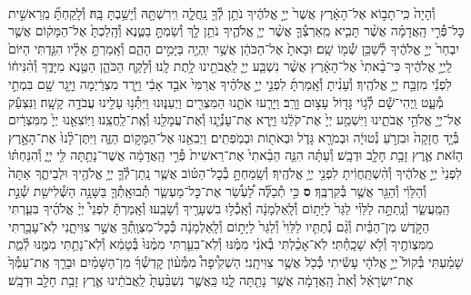 \documentclass[twoside, openany, parskip=half, 11pt]{book}
\begin{document}
\begin{footnotesize}
\begin{multicols}{2}
\\
וְ֯הָיָה֙ כִּֽי־תָב֣וֹא אֶל־הָאָ֔רֶץ אֲשֶׁר֙ יְיָ֣ אֱלֹהֶ֔יךָ נֹתֵ֥ן לְ֯ךָ֖ נַֽחֲלָ֑ה וִֽירִשְׁתָּ֖הּ וְ֯יָשַׁ֥בְתָּ בָּֽהּ׃ וְ֯לָֽקַחְתָּ֞ מֵֽרֵאשִׁ֣ית כׇּל־פְּ֯רִ֣י הָֽאֲדָמָ֗ה אֲשֶׁ֨ר תָּבִ֧יא מֵֽאַרְצְ֯ךָ֛ אֲשֶׁ֨ר יְיָ֧ אֱלֹהֶ֛יךָ נֹתֵ֥ן לָ֖ךְ וְ֯שַׂמְתָּ֣ בַטֶּ֑נֶא וְ֯הָֽלַכְתָּ֙ אֶל־הַמָּק֔וֹם אֲשֶׁ֤ר יִבְחַר֙ יְיָ֣ אֱלֹהֶ֔יךָ לְ֯שַׁכֵּ֥ן שְׁ֯מ֖וֹ שָֽׁם׃ וּבָאתָ֙ אֶל־הַכֹּהֵ֔ן אֲשֶׁ֥ר יִֽהְיֶ֖ה בַּיָּמִ֣ים הָהֵ֑ם וְ֯אָֽמַרְתָּ֣ אֵלָ֗יו הִגַּ֤דְתִּי הַיּוֹם֙ לַֽיְיָ֣ אֱלֹהֶ֔יךָ כִּי־בָ֨אתִי֙ אֶל־הָאָ֔רֶץ אֲשֶׁ֨ר נִשְׁבַּ֧ע יְיָ֛ לַֽאֲבֹתֵ֖ינוּ לָ֥תֶת לָֽנוּ׃
וְ֯לָקַ֧ח הַכֹּהֵ֛ן הַטֶּ֖נֶא מִיָּדֶ֑ךָ וְ֯הִ֨נִּיח֔וֹ לִפְנֵ֕י מִזְבַּ֖ח יְיָ֥ אֱלֹהֶֽיךָ׃ וְ֯עָנִ֨יתָ וְ֯אָֽמַרְתָּ֜ לִפְנֵ֣י יְיָ֣ אֱלֹהֶ֗יךָ אֲרַמִּי֙ אֹבֵ֣ד אָבִ֔י וַיֵּ֣רֶד מִצְרַ֔יְמָה וַיָּ֥גָר שָׁ֖ם בִּמְתֵ֣י מְ֯עָ֑ט וַֽיְהִי־שָׁ֕ם לְ֯ג֥וֹי גָּד֖וֹל עָצ֥וּם וָרָֽב׃ וַיָּרֵ֧עוּ אֹתָ֛נוּ הַמִּצְרִ֖ים וַיְעַנּ֑וּנוּ וַיִּתְּ֯נ֥וּ עָלֵ֖ינוּ עֲבֹדָ֥ה קָשָֽׁה׃ וַנִּצְעַ֕ק אֶל־יְיָ֖ אֱלֹהֵ֣י אֲבֹתֵ֑ינוּ וַיִּשְׁמַ֤ע יְיָ֙ אֶת־קֹלֵ֔נוּ וַיַּ֧רְא אֶת־עָנְ֯יֵ֛נוּ וְ֯אֶת־עֲמָלֵ֖נוּ וְ֯אֶֽת־לַֽחֲצֵֽנוּ׃ וַיּֽוֹצִאֵ֤נוּ יְיָ֙ מִמִּצְרַ֔יִם בְּ֯יָ֤ד חֲזָקָה֙ וּבִזְרֹ֣עַ נְ֯טוּיָ֔ה וּבְמֹרָ֖א גָּדֹ֑ל וּבְאֹת֖וֹת וּבְמֹֽפְתִֽים׃ וַיְבִאֵ֖נוּ אֶל־הַמָּק֣וֹם הַזֶּ֑ה וַיִּתֶּן־לָ֨נוּ֙ אֶת־הָאָ֣רֶץ הַזֹּ֔את אֶ֛רֶץ זָבַ֥ת חָלָ֖ב וּדְבָֽשׁ׃ וְ֯עַתָּ֗ה הִנֵּ֤ה הֵבֵ֨אתִי֙ אֶת־רֵאשִׁית֙ פְּ֯רִ֣י הָֽאֲדָמָ֔ה אֲשֶׁר־נָתַ֥תָּה לִּ֖י יְיָ֑ וְ֯הִנַּחְתּ֗וֹ לִפְנֵי֙ יְיָ֣ אֱלֹהֶ֔יךָ וְ֯הִ֨שְׁתַּֽחֲוִ֔יתָ לִפְנֵ֖י יְיָ֥ אֱלֹהֶֽיךָ׃ וְ֯שָֽׂמַחְתָּ֣ בְ֯כׇל־הַטּ֗וֹב אֲשֶׁ֧ר נָֽתַן־לְ֯ךָ֛ יְיָ֥ אֱלֹהֶ֖יךָ וּלְבֵיתֶ֑ךָ אַתָּה֙ וְ֯הַלֵּוִ֔י וְ֯הַגֵּ֖ר אֲשֶׁ֥ר בְּ֯קִרְבֶּֽךָ׃ \textbf{ס}
כִּ֣י תְ֯כַלֶּ֞ה לַ֠עְשֵׂ֠ר אֶת־כׇּל־מַעְשַׂ֧ר תְּ֯בוּאָֽתְ֯ךָ֛ בַּשָּׁנָ֥ה הַשְּׁ֯לִישִׁ֖ת שְׁ֯נַ֣ת הַֽמַּֽעֲשֵׂ֑ר וְ֯נָֽתַתָּ֣ה לַלֵּוִ֗י לַגֵּר֙ לַיָּת֣וֹם וְ֯לָֽאַלְמָנָ֔ה וְ֯אָֽכְ֯ל֥וּ בִשְׁעָרֶ֖יךָ וְ֯שָׂבֵֽעוּ׃ וְ֯אָֽמַרְתָּ֡ לִפְנֵי֩ יְיָ֨ אֱלֹהֶ֜יךָ בִּעַ֧רְתִּי הַקֹּ֣דֶשׁ מִן־הַבַּ֗יִת וְ֯גַ֨ם נְ֯תַתִּ֤יו לַלֵּוִי֙ וְ֯לַגֵּר֙ לַיָּת֣וֹם וְ֯לָֽאַלְמָנָ֔ה כְּ֯כׇל־מִצְוָֽתְ֯ךָ֖ אֲשֶׁ֣ר צִוִּיתָ֑נִי לֹֽא־עָבַ֥רְתִּי מִמִּצְוֹתֶ֖יךָ וְ֯לֹ֥א שָׁכָֽחְ֯תִּי׃ לֹֽא־אָכַ֨לְתִּי בְ֯אֹנִ֜י מִמֶּ֗נּוּ וְ֯לֹֽא־בִעַ֤רְתִּי מִמֶּ֨נּוּ֙ בְּ֯טָמֵ֔א וְ֯לֹֽא־נָתַ֥תִּי מִמֶּ֖נּוּ לְ֯מֵ֑ת שָׁמַ֗עְתִּי בְּ֯קוֹל֙ יְיָ֣ אֱלֹהָ֔י עָשִׂ֕יתִי כְּ֯כֹ֖ל אֲשֶׁ֥ר צִוִּיתָֽנִי׃ הַשְׁקִ֩יפָה֩ מִמְּ֯ע֨וֹן קׇדְשְׁ֯ךָ֜ מִן־הַשָּׁמַ֗יִם וּבָרֵ֤ךְ אֶֽת־עַמְּ֯ךָ֙ אֶת־יִשְׂרָאֵ֔ל וְ֯אֵת֙ הָֽאֲדָמָ֔ה אֲשֶׁ֥ר נָתַ֖תָּה לָ֑נוּ כַּֽאֲשֶׁ֤ר נִשְׁבַּ֨עְתָּ֙ לַֽאֲבֹתֵ֔ינוּ אֶ֛רֶץ זָבַ֥ת חָלָ֖ב וּדְבָֽשׁ׃


\end{multicols}
\end{footnotesize}
\end{document}
